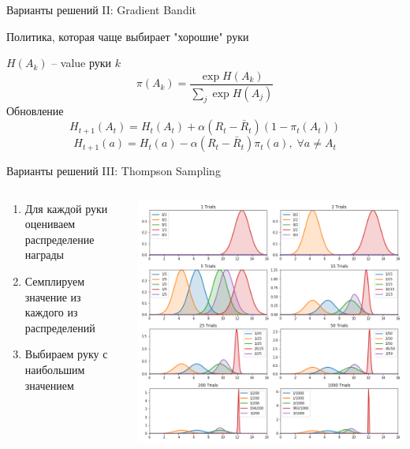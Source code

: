 \documentclass[11pt,aspectratio=169,handout]{beamer}
\begin{document}
\begin{frame}{Варианты решений II: Gradient Bandit \cite{BANDITS2}}

Политика, которая чаще выбирает "хорошие" руки

$H(A_k)$ -- value руки $k$
\[
\pi(A_k) = \frac{\exp H(A_k)}{\sum_j \exp H(A_j)}
\]
Обновление
\[
H_{t+1} (A_t) = H_t(A_t) + \alpha (R_t - \bar R_t)(1 - \pi_t(A_t))
\]
\[
H_{t+1} (a) = H_t(a) - \alpha (R_t - \bar R_t)\pi_t(a), \; \forall a \neq A_t
\]

\end{frame}

\begin{frame}{Варианты решений III: Thompson Sampling}

\begin{columns}

\begin{column}{0.4\textwidth}
\begin{enumerate}
\item Для каждой руки оцениваем распределение награды
\item Семплируем значение из каждого из распределений
\item Выбираем руку с наибольшим значением
\end{enumerate}
\end{column}

\begin{column}{0.55\textwidth}

\begin{small}
\begin{center}
\includegraphics[scale=0.2]{images/thompson.png}
\end{center}
\end{small}

\end{column}
\end{columns}

\end{frame}
\end{document}
